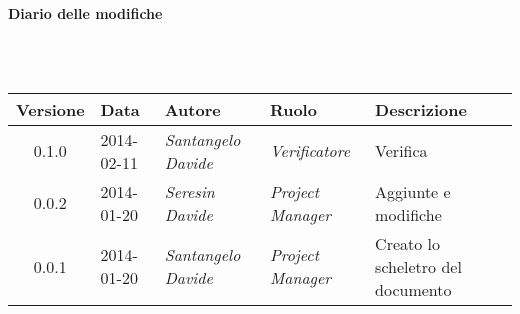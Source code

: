 \noindent\begin{Large}\textbf{Diario delle modifiche}\end{Large}\\
\\
\begin{small}
\begin{tabular}{|c|p{1.8cm}|p{2.8cm}|p{2.8cm}|p{3.5cm}|}
\hline
Versione & Data & Autore & Ruolo & Descrizione \\
\hline
\hline
0.1.0 & 2014-02-11 & 
\textit{Santangelo Davide} &
\textit{Verificatore} &  Verifica\\
\hline
0.0.2 & 2014-01-20 & 
\textit{Seresin Davide} &
\textit{Project Manager} &  Aggiunte e modifiche\\
\hline
0.0.1 & 2014-01-20 & 
\textit{Santangelo Davide} &

\textit{Project Manager} &  Creato lo scheletro del documento\\
\hline
\end{tabular}\\
\end{small}